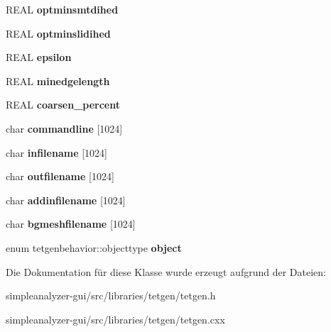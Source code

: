 \begin{DoxyCompactItemize}
\item 
\hypertarget{classtetgenbehavior_a3f4246164c85bd2d1f88ed4e9c739398}{R\-E\-A\-L {\bfseries optminsmtdihed}}\label{classtetgenbehavior_a3f4246164c85bd2d1f88ed4e9c739398}

\item 
\hypertarget{classtetgenbehavior_a7298676875d7609798023ec2df17ccb9}{R\-E\-A\-L {\bfseries optminslidihed}}\label{classtetgenbehavior_a7298676875d7609798023ec2df17ccb9}

\item 
\hypertarget{classtetgenbehavior_a65abc49ced365588d5c7bdfce638fab5}{R\-E\-A\-L {\bfseries epsilon}}\label{classtetgenbehavior_a65abc49ced365588d5c7bdfce638fab5}

\item 
\hypertarget{classtetgenbehavior_a51d41b9aaa89c0dc620c4af78848dfde}{R\-E\-A\-L {\bfseries minedgelength}}\label{classtetgenbehavior_a51d41b9aaa89c0dc620c4af78848dfde}

\item 
\hypertarget{classtetgenbehavior_ac9aa3f69cf550eb2ee81fc0cae2fb444}{R\-E\-A\-L {\bfseries coarsen\-\_\-percent}}\label{classtetgenbehavior_ac9aa3f69cf550eb2ee81fc0cae2fb444}

\item 
\hypertarget{classtetgenbehavior_a56dcfc2ab395c63b7f99d84b2cd1f4e8}{char {\bfseries commandline} \mbox{[}1024\mbox{]}}\label{classtetgenbehavior_a56dcfc2ab395c63b7f99d84b2cd1f4e8}

\item 
\hypertarget{classtetgenbehavior_ac879f6843038d5428199079c515ce6e6}{char {\bfseries infilename} \mbox{[}1024\mbox{]}}\label{classtetgenbehavior_ac879f6843038d5428199079c515ce6e6}

\item 
\hypertarget{classtetgenbehavior_aa066e0b8f2b5b3d0f9e5c6b74e8eadc4}{char {\bfseries outfilename} \mbox{[}1024\mbox{]}}\label{classtetgenbehavior_aa066e0b8f2b5b3d0f9e5c6b74e8eadc4}

\item 
\hypertarget{classtetgenbehavior_a627804470698cc1883fd93999727e334}{char {\bfseries addinfilename} \mbox{[}1024\mbox{]}}\label{classtetgenbehavior_a627804470698cc1883fd93999727e334}

\item 
\hypertarget{classtetgenbehavior_ae72a1c6b8d7389d4fad21fa584207aba}{char {\bfseries bgmeshfilename} \mbox{[}1024\mbox{]}}\label{classtetgenbehavior_ae72a1c6b8d7389d4fad21fa584207aba}

\item 
\hypertarget{classtetgenbehavior_ae01337ff20025a815a4f2e4d8c3d2871}{enum tetgenbehavior\-::objecttype {\bfseries object}}\label{classtetgenbehavior_ae01337ff20025a815a4f2e4d8c3d2871}

\end{DoxyCompactItemize}


Die Dokumentation für diese Klasse wurde erzeugt aufgrund der Dateien\-:\begin{DoxyCompactItemize}
\item 
simpleanalyzer-\/gui/src/libraries/tetgen/tetgen.\-h\item 
simpleanalyzer-\/gui/src/libraries/tetgen/tetgen.\-cxx\end{DoxyCompactItemize}

